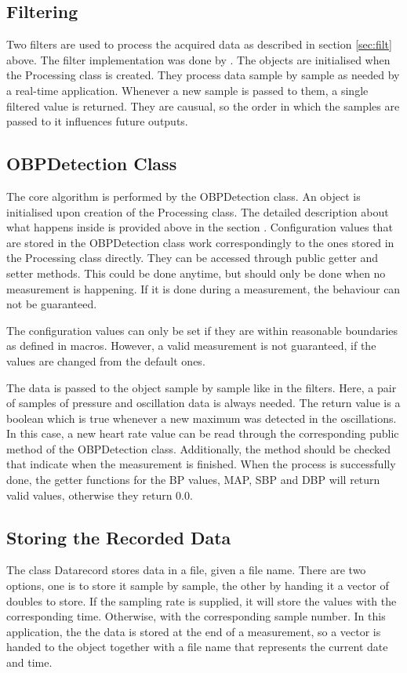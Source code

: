\subsection{Filtering}
Two filters are used to process the acquired data as described in section \ref{sec:filt} above. The filter implementation was done by \citet{Porr2020iir}. The objects are initialised when the Processing class is created. They process data sample by sample as needed by a real-time application. Whenever a new sample is passed to them, a single filtered value is returned. They are causual, so the order in which the samples are passed to it influences future outputs.


\subsection{OBPDetection Class}
The core algorithm is performed by the OBPDetection class. An object is initialised upon creation of the Processing class. The detailed description about what happens inside is provided above in the section . Configuration values that are stored in the OBPDetection class work correspondingly to the ones stored in the Processing class directly. They can be accessed through public getter and setter methods. This could be done anytime, but should only be done when no measurement is happening. If it is done during a measurement, the behaviour can not be guaranteed. 

The configuration values can only be set if they are within reasonable boundaries as defined in macros. However, a valid measurement is not guaranteed, if the values are changed from the default ones.

The data is passed to the object sample by sample like in the filters. Here, a pair of samples of pressure and oscillation data is always needed. The return value is a boolean which is true whenever a new maximum was detected in the oscillations. In this case, a new heart rate value can be read through the corresponding public method of the OBPDetection class. Additionally, the method should be checked that indicate when the measurement is finished. When the process is successfully done, the getter functions for the BP values, MAP, SBP and DBP will return valid values, otherwise they return $0.0$.

\subsection{Storing the Recorded Data}
The class Datarecord stores data in a file, given a file name. There are two options, one is to store it sample by sample, the other by handing it a vector of doubles to store. If the sampling rate is supplied, it will store the values with the corresponding time. Otherwise, with the corresponding sample number. In this application, the the data is stored at the end of a measurement, so a vector is handed to the object together with a file name that represents the current date and time. 


